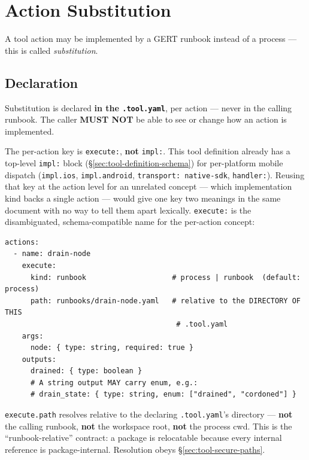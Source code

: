 \section{Action Substitution}
\label{sec:tool-substitution}

A tool action may be implemented by a GERT runbook instead of a process ---
this is called \emph{substitution}.

\subsection{Declaration}

Substitution is declared \textbf{in the \texttt{.tool.yaml}}, per action ---
never in the calling runbook. The caller \textbf{MUST NOT} be able to see or
change how an action is implemented.

The per-action key is \texttt{execute:}, \textbf{not} \texttt{impl:}. This
tool definition already has a top-level \texttt{impl:} block
(\S\ref{sec:tool-definition-schema}) for per-platform mobile dispatch
(\texttt{impl.ios}, \texttt{impl.android}, \texttt{transport: native-sdk},
\texttt{handler:}). Reusing that key at the action level for an unrelated
concept --- which implementation kind backs a single action --- would give
one key two meanings in the same document with no way to tell them apart
lexically. \texttt{execute:} is the disambiguated, schema-compatible name
for the per-action concept:

\begin{verbatim}
actions:
  - name: drain-node
    execute:
      kind: runbook                    # process | runbook  (default: process)
      path: runbooks/drain-node.yaml   # relative to the DIRECTORY OF THIS
                                        # .tool.yaml
    args:
      node: { type: string, required: true }
    outputs:
      drained: { type: boolean }
      # A string output MAY carry enum, e.g.:
      # drain_state: { type: string, enum: ["drained", "cordoned"] }
\end{verbatim}

\texttt{execute.path} resolves relative to the declaring \texttt{.tool.yaml}'s
directory --- \textbf{not} the calling runbook, \textbf{not} the workspace
root, \textbf{not} the process cwd. This is the ``runbook-relative''
contract: a package is relocatable because every internal reference is
package-internal. Resolution obeys \S\ref{sec:tool-secure-paths}.

